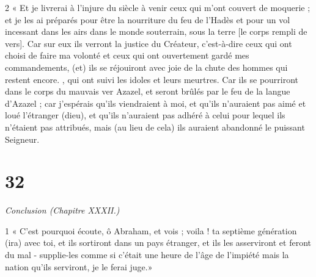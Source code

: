 \par 2 « Et je livrerai à l'injure du siècle à venir ceux qui m'ont couvert de moquerie ; et je les ai préparés pour être la nourriture du feu de l'Hadès et pour un vol incessant dans les airs dans le monde souterrain, sous la terre [le corps rempli de vers]. Car sur eux ils verront la justice du Créateur, c'est-à-dire ceux qui ont choisi de faire ma volonté et ceux qui ont ouvertement gardé mes commandements, (et) ils se réjouiront avec joie de la chute des hommes qui restent encore. , qui ont suivi les idoles et leurs meurtres. Car ils se pourriront dans le corps du mauvais ver Azazel, et seront brûlés par le feu de la langue d'Azazel ; car j'espérais qu'ils viendraient à moi, et qu'ils n'auraient pas aimé et loué l'étranger (dieu), et qu'ils n'auraient pas adhéré à celui pour lequel ils n'étaient pas attribués, mais (au lieu de cela) ils auraient abandonné le puissant Seigneur.

\chapter{32}

\par \textit{Conclusion (Chapitre XXXII.)}

\par 1 « C’est pourquoi écoute, ô Abraham, et vois ; voila ! ta septième génération (ira) avec toi, et ils sortiront dans un pays étranger, et ils les asserviront et feront du mal - supplie-les comme si c'était une heure de l'âge de l'impiété mais la nation qu'ils serviront, je le ferai juge.»

